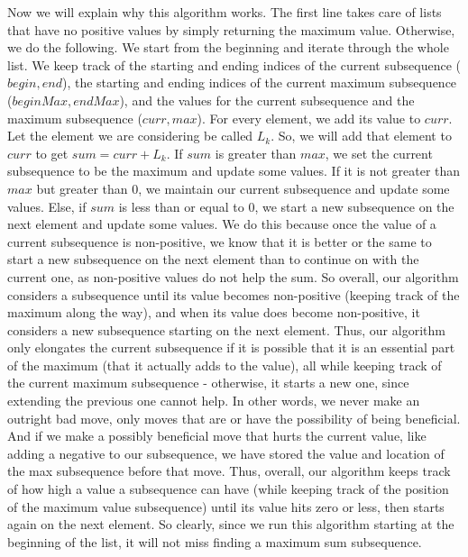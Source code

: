 \documentclass{article}
\begin{document}
Now we will explain why this algorithm works. The first line takes care of lists
that have no positive values by simply returning the maximum value. Otherwise,
we do the following. We start from the
beginning and iterate through the whole list. We keep track of the starting and
ending indices of the current subsequence ($begin,end$), the starting and ending
indices of the current maximum subsequence ($beginMax,endMax$), and the values
for the current subsequence and the maximum subsequence ($curr,max$). For every element, we add its
value to $curr$. Let the element we are considering be called $L_k$.
So, we will add that element to $curr$ to get $sum = curr + L_k$. If $sum$ is
greater than $max$, we set the current subsequence to be the maximum and update
some values. If it is not greater than $max$ but greater than $0$, we maintain our current
subsequence and update some values. Else, if $sum$ is less than or equal to $0$, we start a new
subsequence on the next element and update some values. We do this because once the value of a current
subsequence is non-positive, we know that it is better or the same to start a new
subsequence on the next element than to continue on with the current one, as
non-positive values do not help the sum. So overall, our algorithm considers
a subsequence until its value becomes non-positive (keeping track of the
maximum along the way), and when its value does become non-positive, it
considers a new subsequence starting on the next element. Thus, our algorithm
only elongates the current subsequence if it is possible that it is an essential
part of the maximum (that it actually adds to the value), all while keeping track of
the current maximum subsequence
- otherwise, it starts a new one, since extending the previous one cannot help.
In other words, we never make an outright bad move, only moves that are or have
the possibility of being beneficial. And if we make a possibly beneficial move
that hurts the current value, like adding a negative to our subsequence, we have
stored the value and location of the max subsequence before that move.
Thus, overall, our algorithm keeps track of how high a value a subsequence can
have (while keeping track of the position of the maximum value subsequence)
until its value hits zero or less, then starts again on the next element.
So clearly, since we run this algorithm starting at the beginning of the list,
it will not miss finding a maximum sum subsequence.
\newpage

\end{document}
